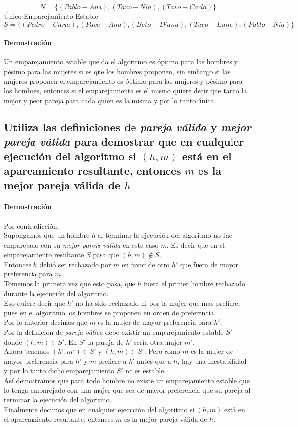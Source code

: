 \documentclass[12pt]{article}
\begin{document}
\begin{equation}\label{N_set}
N = \{(Pablo-Ana), (Tavo-Nia), (Tavo-Carla)\} 
\end{equation}
Único Emparejamiento Estable:
\begin{equation}\label{S_set1}
S = \{(Pedro-Carla), (Paco-Ana), (Beto-Diana), (Tavo-Luna), (Pablo-Nia)\} 
\end{equation}
\paragraph{Demostración}\label{demos_gale}Un emparejamiento estable que da el algoritmo es óptimo para los hombres y pésimo para las mujeres si es que los hombres proponen, sin embargo si las mujeres proponen el emparejamiento es óptimo para las mujeres y pésimo para los hombres, entonces si el emparejamiento es el mismo quiere decir que tanto la mejor y peor pareja para cada quién es la misma y por lo tanto única.
\subsection{Utiliza las definiciones de \textit{pareja válida} y \textit{mejor pareja válida} para demostrar que en cualquier ejecución del algoritmo si $(h,m)$ está en el apareamiento resultante, entonces $m$ es la mejor pareja válida de $h$}
\paragraph{Demostración} Por contradicción.\\
Supongamos que un hombre $h$ al terminar  la ejecución del algoritmo no fue emparejado con su \textit{mejor pareja válida} en este caso $m$. Es decir que en el emparejamiento resultante $S$ pasa que $(h,m) \notin S$.\\ Entonces $h$ debió ser rechazado por $m$ en favor de otro $h'$ que fuera de mayor preferencia para $m$. \\
Tomemos la primera vez que esto pasa, que $h$ fuera el primer hombre rechazado durante la ejecución del algoritmo. 
\\Eso quiere decir que $h'$ no ha sido rechazado ni por la mujer que mas prefiere, pues en el algoritmo los hombres se proponen en orden de preferencia.
\\ Por lo anterior decimos que $m$ es la mujer de mayor preferencia para $h'$.\\
Por la definición de \textit{pareja válida} debe existir un emparejamiento estable $S'$ donde $(h,m)\in S'$. En $S'$  la pareja de $h'$ sería otra mujer $m'$. \\ Ahora tenemos $(h', m')\in S'$ y $(h,m) \in S'$.
Pero como $m$ es la mujer de mayor preferencia para $h'$ y $m$ prefiere a $h'$ antes que a $h$, hay una inestabilidad y por lo tanto dicho emparejamiento $S'$ no es estable.\\
 Así demostramos que para todo hombre no existe un emparejamiento estable que lo tenga emparejado con una mujer que sea de mayor preferencia que su pareja al terminar la ejecución del algoritmo.\\ 
Finalmente decimos que en cualquier ejecución del algoritmo si $(h,m)$ está en el apareamiento resultante, entonces $m$ es la mejor pareja válida de $h$.
\end{document}
